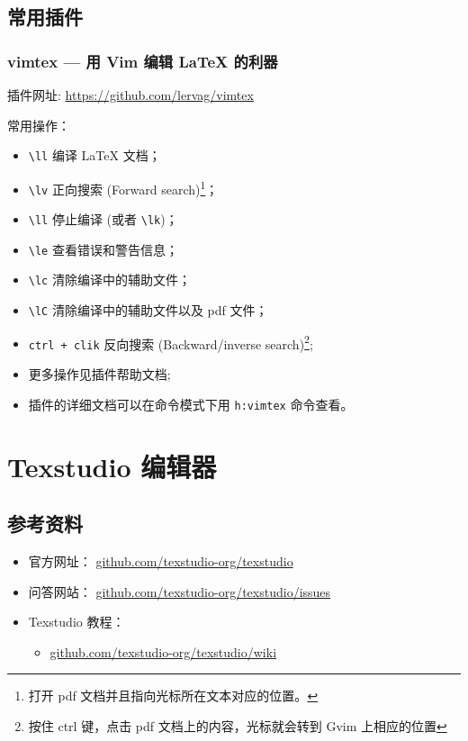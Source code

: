 \documentclass[
    11pt,
    base=hide,
    cite=authoryear,
    device=phone,
    lang=cn,
    mode=simple,
    result=answer,
    toc=onecol,
]{elegantbook_sierxue}
\begin{document}
\subsection{常用插件}%
\label{sub:vim-plugins}

\subsubsection{vimtex --- 用 Vim 编辑 \LaTeX{} 的利器}%
\label{ssub:vim-plugin-vimtex}

插件网址:
\href{https://github.com/lervag/vimtex}{https://github.com/lervag/vimtex}

常用操作：
\begin{itemize}
    \item \lstinline{\ll} 编译 \LaTeX{} 文档；
    \item \lstinline{\lv} 正向搜索 (Forward search)\footnote{
        打开 pdf 文档并且指向光标所在文本对应的位置。}；
    \item \lstinline{\ll} 停止编译 (或者 \lstinline{\lk})；
    \item \lstinline{\le} 查看错误和警告信息；
    \item \lstinline{\lc} 清除编译中的辅助文件；
    \item \lstinline{\lC} 清除编译中的辅助文件以及 pdf 文件；
    \item \lstinline{ctrl + clik} 反向搜索 (Backward/inverse search)\footnote{
        按住 ctrl 键，点击 pdf 文档上的内容，光标就会转到 Gvim 上相应的位置};
    \item 更多操作见插件帮助文档;
    \item 插件的详细文档可以在命令模式下用 \lstinline{h:vimtex} 命令查看。
\end{itemize}

\section{Texstudio 编辑器}%
\label{sec:texstudio}

\subsection{参考资料}%
\label{sub:texstudio-refs}

\begin{itemize}
    \item 官方网址： \href{https://github.com/texstudio-org/texstudio}
        {github.com/texstudio-org/texstudio}
    \item 问答网站：
        \href{https://github.com/texstudio-org/texstudio/issues}
        {github.com/texstudio-org/texstudio/issues}
    \item Texstudio 教程：
        \begin{itemize}
            \item \href{https://github.com/texstudio-org/texstudio/wiki}
                {github.com/texstudio-org/texstudio/wiki}
        \end{itemize}
\end{itemize}
\end{document}
